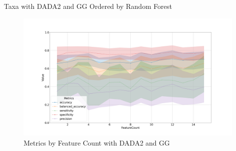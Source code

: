 \documentclass[a4paper]{article}
\begin{document}
            \begin{table}[p]
                \centering
                \caption{Taxa with DADA2 and GG Ordered by Random Forest}
                \label{tb:RF-every-dada2-gg}

            \end{table}

            \begin{figure}[p]
                \centering
                \includegraphics[width=0.7 \linewidth]{figures/RandomForest/ANCOM.DADA2.gg/metrics.png}
                \caption{Metrics by Feature Count with DADA2 and GG}
                \label{fig:RF-every-metrics-DADA2-gg}
            \end{figure}
\end{document}

